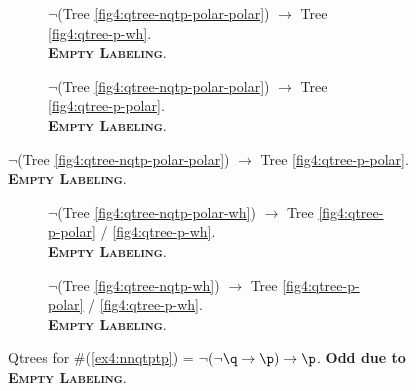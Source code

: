 \begin{figure}[H]
	\centering
	\begin{subfigure}[b]{.45\linewidth}
		\centering
		\scalebox{1}{
			\begin{forest}
				[CS[\q][$\neg\q$[\p][$\neg\p\cap\neg\q$[\r][...]]]]
			\end{forest}
		}
		\caption[]{$\neg$(Tree \ref{fig4:qtree-nqtp-polar-polar}) $\rightarrow$ Tree \ref{fig4:qtree-p-wh}.\\ \textbf{\textsc{Empty Labeling}}.}
	\end{subfigure}
	\hfill
	\begin{subfigure}[b]{.45\linewidth}
		\centering
		\scalebox{1}{
			\begin{forest}
				[CS[\q][$\neg\q$[\p][$\neg\p\cap\neg\q$]]]
			\end{forest}
		}
		\caption[]{$\neg$(Tree \ref{fig4:qtree-nqtp-polar-polar}) $\rightarrow$ Tree \ref{fig4:qtree-p-polar}.\\ \textbf{\textsc{Empty Labeling}}.}
	\end{subfigure}
\end{figure}
\begin{figure}[H]
\centering
\ContinuedFloat	
	\begin{subfigure}[b]{.45\linewidth}
		\centering
		\scalebox{1}{
			\begin{forest}
				[CS[\q][$\neg\q$[\p][\r][...]]]
			\end{forest}
		}
		\caption[]{$\neg$(Tree \ref{fig4:qtree-nqtp-polar-wh}) $\rightarrow$ Tree \ref{fig4:qtree-p-polar} / \ref{fig4:qtree-p-wh}.\\ \textbf{\textsc{Empty Labeling}}.}
	\end{subfigure}
	\hfill
	\begin{subfigure}[b]{.45\linewidth}
		\centering
		\scalebox{1}{
			\begin{forest}
				[CS[\p][\q][\r][...]]
			\end{forest}
		}
		\caption[]{$\neg$(Tree \ref{fig4:qtree-nqtp-wh}) $\rightarrow$ Tree \ref{fig4:qtree-p-polar} / \ref{fig4:qtree-p-wh}.\\ \textbf{\textsc{Empty Labeling}}.}
	\end{subfigure}
	\caption[]{Qtrees for \#(\ref{ex4:nnqtptp}) = $\neg (\neg \q \rightarrow \p) \rightarrow \p$. \textbf{Odd due to \textsc{Empty Labeling}}.}\label{fig4:qtrees-n(nqtp)tp}
\end{figure}

